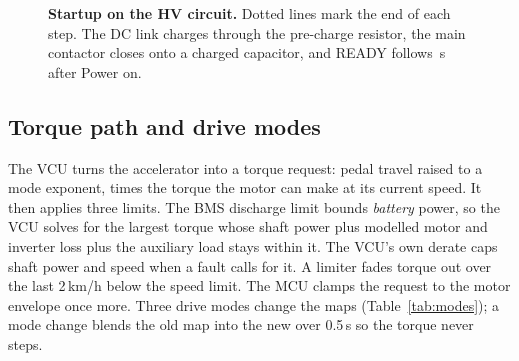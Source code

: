 \documentclass[10pt]{article}
\begin{document}
\begin{figure}[!htbp]
\centering
{}
\caption{\textbf{Startup on the HV circuit.} Dotted lines mark the end of each step. The DC link charges through the pre-charge resistor, the main contactor closes onto a charged capacitor, and READY follows \StartReadyS\,s after Power on.}
\label{fig:startup}
\end{figure}

\subsection{Torque path and drive modes}

The VCU turns the accelerator into a torque request: pedal travel raised to a mode exponent, times the torque the motor can make at its current speed. It then applies three limits. The BMS discharge limit bounds \emph{battery} power, so the VCU solves for the largest torque whose shaft power plus modelled motor and inverter loss plus the auxiliary load stays within it. The VCU's own derate caps shaft power and speed when a fault calls for it. A limiter fades torque out over the last 2\,km/h below the speed limit. The MCU clamps the request to the motor envelope once more. Three drive modes change the maps (Table~\ref{tab:modes}); a mode change blends the old map into the new over 0.5\,s so the torque never steps.
\end{document}
